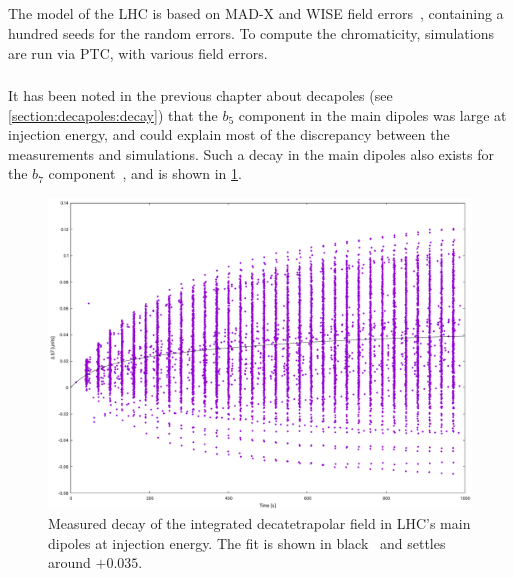 

\subsection{}
\label{sec:nl_chroma_model}

The model of the LHC is based on MAD-X and WISE field errors~\cite{p_hagen_wise_2006}, containing
a hundred seeds for the random errors. To compute the chromaticity, simulations are run via PTC,
with various field errors.


\subsubsection{}

It has been noted in the previous chapter about decapoles (see \cref{section:decapoles:decay}) that
the $b_5$ component in the main dipoles was large at injection energy, and could explain most of the
discrepancy between the measurements and simulations.
Such a decay in the main dipoles also exists for the $b_7$ component~\cite{deniau2024private}, and
is shown in \cref{fig:high_orders:b7_decay}. 

\begin{figure}[!htb]
    \centering
    \includegraphics[width=0.9\columnwidth]{images/decay_b7.pdf}
    \caption{Measured decay of the integrated decatetrapolar field in LHC's main dipoles at
    injection energy. The fit is shown in black~\cite{deniau2024private} and settles around
    $+0.035$.}
    \label{fig:high_orders:b7_decay}
\end{figure}

